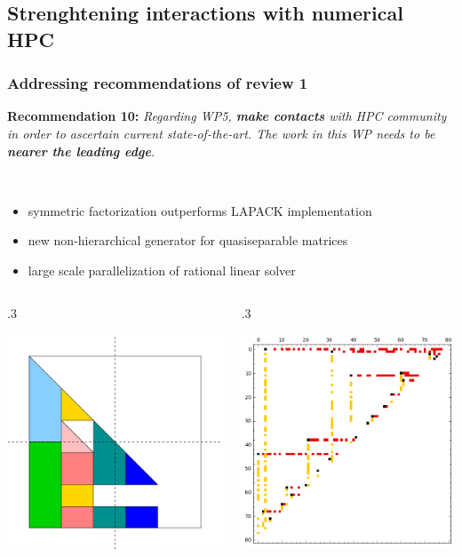 \documentclass{beamer}
\begin{document}
\subsection{Strenghtening interactions with numerical HPC}
\begin{frame}
\frametitle{Addressing recommendations of review 1}
    \textbf{Recommendation 10:} \textit{Regarding WP5, \textbf{make contacts} with HPC community in order to ascertain current state-of-the-art. The work in this WP needs to be \textbf{nearer the leading edge}.}
    \begin{description}
    \item<2-> [Leading edge achievements in linear algebra] \
      {\small
      \begin{itemize}
      \item symmetric factorization outperforms LAPACK implementation
      \item new non-hierarchical generator for quasiseparable matrices
      \item large scale parallelization of rational linear solver
      \end{itemize}
      }
    \begin{columns}
      \begin{column} {.3\textwidth}
        \begin{center}
          \includegraphics[width=.6\textwidth]{ARrec11}
      \end{center}
      \end{column}
      \begin{column} {.3\textwidth}
        \begin{center}
          \includegraphics[width=.6\textwidth]{Bruhat}

\end{center}
\end{column}
\end{columns}
\end{description}
\end{frame}
\end{document}
